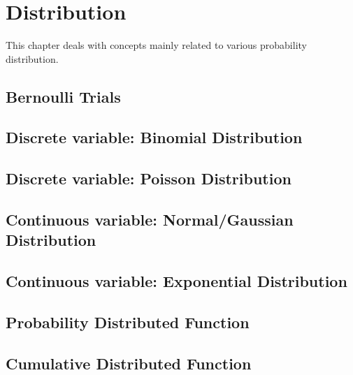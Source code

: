 \graphicspath{%
{chapter1graph/}%
{chapter1graph/bg/}}


\chapter{Distribution}

This chapter deals with concepts mainly related to various probability distribution.

\section{Bernoulli Trials}

\section{Discrete variable: Binomial Distribution}

\section{Discrete variable: Poisson Distribution}

\section{Continuous variable: Normal/Gaussian Distribution}

\section{Continuous variable: Exponential Distribution}

\section{Probability Distributed Function}

\section{Cumulative Distributed Function}

